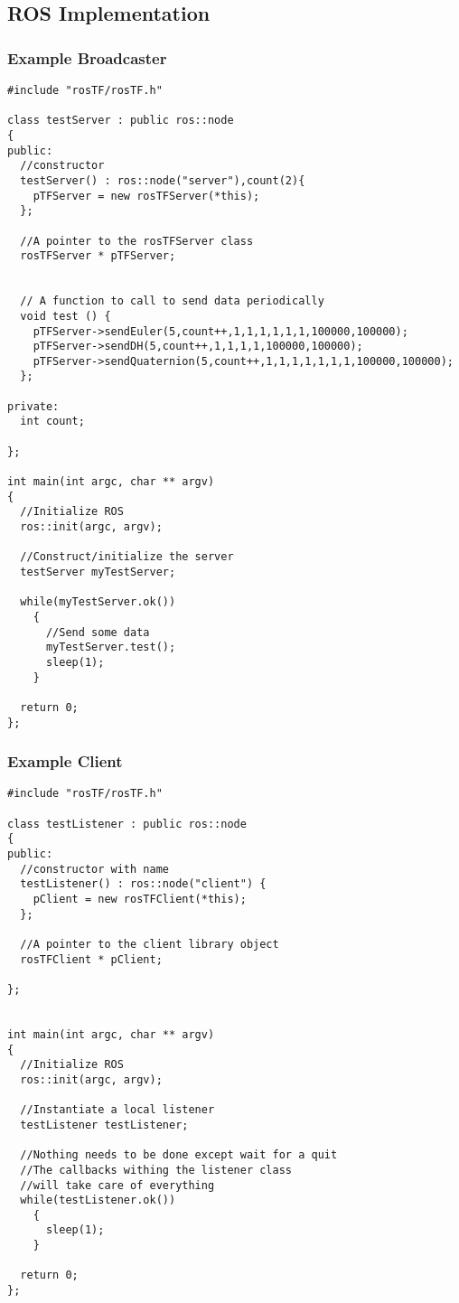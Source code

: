 \documentclass[12pt]{article}
\begin{document}
\subsection{ROS Implementation}

\subsubsection{Example Broadcaster}
\begin{verbatim}
#include "rosTF/rosTF.h"

class testServer : public ros::node
{
public:
  //constructor
  testServer() : ros::node("server"),count(2){
    pTFServer = new rosTFServer(*this);
  };

  //A pointer to the rosTFServer class
  rosTFServer * pTFServer;


  // A function to call to send data periodically
  void test () {
    pTFServer->sendEuler(5,count++,1,1,1,1,1,1,100000,100000);
    pTFServer->sendDH(5,count++,1,1,1,1,100000,100000);
    pTFServer->sendQuaternion(5,count++,1,1,1,1,1,1,1,100000,100000);
  };

private:
  int count;

};

int main(int argc, char ** argv)
{
  //Initialize ROS
  ros::init(argc, argv);

  //Construct/initialize the server
  testServer myTestServer;
  
  while(myTestServer.ok())
    {
      //Send some data
      myTestServer.test();
      sleep(1);
    }

  return 0;
};
\end{verbatim}

\subsubsection{Example Client}
\begin{verbatim}
#include "rosTF/rosTF.h"

class testListener : public ros::node
{
public:
  //constructor with name
  testListener() : ros::node("client") {
    pClient = new rosTFClient(*this);
  };

  //A pointer to the client library object  
  rosTFClient * pClient;

};


int main(int argc, char ** argv)
{
  //Initialize ROS
  ros::init(argc, argv);

  //Instantiate a local listener
  testListener testListener;
  
  //Nothing needs to be done except wait for a quit
  //The callbacks withing the listener class 
  //will take care of everything
  while(testListener.ok())
    {
      sleep(1);
    }

  return 0;
};
\end{verbatim}
\end{document}
